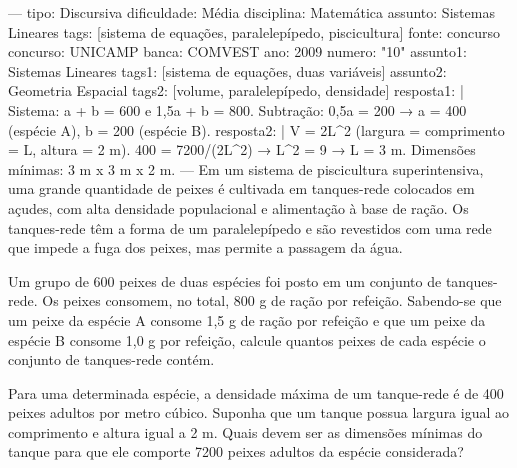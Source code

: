 \setquestion
---
tipo: Discursiva
dificuldade: Média
disciplina: Matemática
assunto: Sistemas Lineares
tags: [sistema de equações, paralelepípedo, piscicultura]
fonte: concurso
concurso: UNICAMP
banca: COMVEST
ano: 2009
numero: "10"
assunto1: Sistemas Lineares
tags1: [sistema de equações, duas variáveis]
assunto2: Geometria Espacial
tags2: [volume, paralelepípedo, densidade]
resposta1: |
  Sistema: a + b = 600 e 1,5a + b = 800. Subtração: 0,5a = 200 → a = 400 (espécie A), b = 200 (espécie B).
resposta2: |
  V = 2L^2 (largura = comprimento = L, altura = 2 m).
  400 = 7200/(2L^2) → L^2 = 9 → L = 3 m. Dimensões mínimas: 3 m x 3 m x 2 m.
---
Em um sistema de piscicultura superintensiva, uma grande quantidade de peixes é cultivada em tanques-rede colocados em açudes, com alta densidade populacional e alimentação à base de ração. Os tanques-rede têm a forma de um paralelepípedo e são revestidos com uma rede que impede a fuga dos peixes, mas permite a passagem da água.

\questionitem
Um grupo de 600 peixes de duas espécies foi posto em um conjunto de tanques-rede. Os peixes consomem, no total, 800 g de ração por refeição. Sabendo-se que um peixe da espécie A consome 1,5 g de ração por refeição e que um peixe da espécie B consome 1,0 g por refeição, calcule quantos peixes de cada espécie o conjunto de tanques-rede contém.

\questionitem
Para uma determinada espécie, a densidade máxima de um tanque-rede é de 400 peixes adultos por metro cúbico. Suponha que um tanque possua largura igual ao comprimento e altura igual a 2 m. Quais devem ser as dimensões mínimas do tanque para que ele comporte 7200 peixes adultos da espécie considerada?
